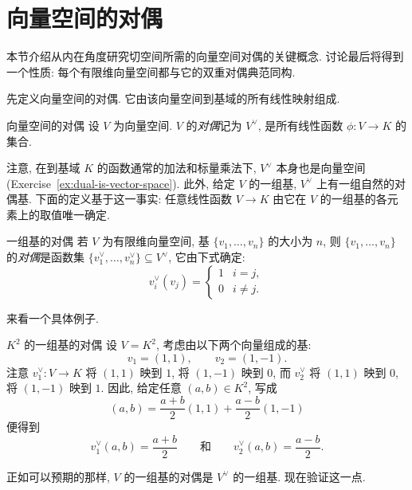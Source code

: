 \section{向量空间的对偶}\label{sec:vector-space-duality}

本节介绍从内在角度研究切空间所需的向量空间对偶的关键概念. 讨论最后将得到一个性质: 每个有限维向量空间都与它的双重对偶典范同构.

先定义向量空间的对偶. 它由该向量空间到基域的所有线性映射组成.

\begin{Definition}{向量空间的对偶}\leavevmode\label{def:dual-vector-space}
设 $V$ 为向量空间. $V$ 的\emph{对偶}记为 $V^{\vee}$, 是所有线性函数 $\phi:V\to K$ 的集合.
\end{Definition}

注意, 在到基域 $K$ 的函数通常的加法和标量乘法下, $V^{\vee}$ 本身也是向量空间 (Exercise~\ref{ex:dual-is-vector-space}). 此外, 给定 $V$ 的一组基, $V^{\vee}$ 上有一组自然的\textquotedbl{}对偶\textquotedbl{}基. 下面的定义基于这一事实: 任意线性函数 $V\to K$ 由它在 $V$ 的一组基的各元素上的取值唯一确定.

\begin{Definition}{一组基的对偶}\leavevmode\label{def:dual-of-a-basis}
若 $V$ 为有限维向量空间, 基 $\{v_{1},\ldots,v_{n}\}$ 的大小为 $n$, 则 $\{v_{1},\ldots,v_{n}\}$ 的\emph{对偶}是函数集 $\{v_{1}^{\vee},\ldots,v_{n}^{\vee}\}\subseteq V^{\vee}$, 它由下式确定:
\[
  v_{i}^{\vee}(v_{j})=
  \begin{cases}
    1 & i=j,\\
    0 & i\neq j.
  \end{cases}
\]
\end{Definition}

来看一个具体例子.

\begin{Example}{$K^{2}$ 的一组基的对偶}\leavevmode\label{ex:dual-of-a-basis-of-k-squared}
设 $V=K^{2}$, 考虑由以下两个向量组成的基:
\[
  v_{1}=(1,1),\qquad v_{2}=(1,-1).
\]
注意 $v_{1}^{\vee}:V\to K$ 将 $(1,1)$ 映到 $1$, 将 $(1,-1)$ 映到 $0$, 而 $v_{2}^{\vee}$ 将 $(1,1)$ 映到 $0$, 将 $(1,-1)$ 映到 $1$. 因此, 给定任意 $(a,b)\in K^{2}$, 写成
\[
  (a,b)=\frac{a+b}{2}(1,1)+\frac{a-b}{2}(1,-1)
\]
便得到
\[
  v_{1}^{\vee}(a,b)=\frac{a+b}{2}
  \qquad\text{和}\qquad
  v_{2}^{\vee}(a,b)=\frac{a-b}{2}.
\]
\end{Example}

正如可以预期的那样, $V$ 的一组基的对偶是 $V^{\vee}$ 的一组基. 现在验证这一点.

